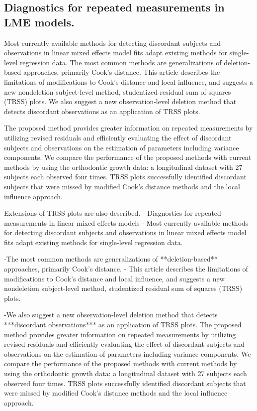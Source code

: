 \subsection*{Diagnostics for repeated measurements in LME  models.}

Most currently available methods for detecting discordant subjects and observations in linear mixed effects model fits adapt existing methods for single-level regression data. The most common methods are generalizations of deletion-based approaches, primarily Cook's distance. This article describes the limitations of modifications to Cook's distance and local influence, and suggests a new nondeletion subject-level method, studentized residual sum of squares (TRSS) plots. We also suggest a new observation-level deletion method that detects discordant observations as an application of TRSS plots. 

The proposed method provides greater information on repeated measurements by utilizing revised residuals and efficiently evaluating the effect of discordant subjects and observations on the estimation of parameters including variance components. We compare the performance of the proposed methods with current methods by using the orthodontic growth data: a longitudinal dataset with 27 subjects each observed four times. TRSS plots successfully identified discordant subjects that were missed by modified Cook's distance methods and the local influence approach. 

Extensions of TRSS plots are also described.
- Diagnostics for repeated measurements in linear mixed effects models
- Most currently available methods for detecting discordant subjects and observations in linear mixed effects model fits adapt existing methods for single-level regression data.

-The most common methods are generalizations of **deletion-based** approaches, primarily Cook's distance. 
- This article describes the limitations of modifications to Cook's distance and local influence, and suggests a 
new nondeletion subject-level method, studentized residual sum of squares (TRSS) plots. 

-We also suggest a new observation-level deletion method that detects ***discordant observations*** as an application of TRSS plots. The proposed method provides greater information on repeated measurements by utilizing revised residuals and efficiently evaluating the effect of discordant subjects and observations on the estimation of parameters including variance components. We compare the performance of the proposed methods with current methods by using the orthodontic growth data: a longitudinal dataset with 27 subjects each observed four times. TRSS plots successfully identified discordant subjects that were missed by
modified Cook's distance methods and the local influence approach. 

